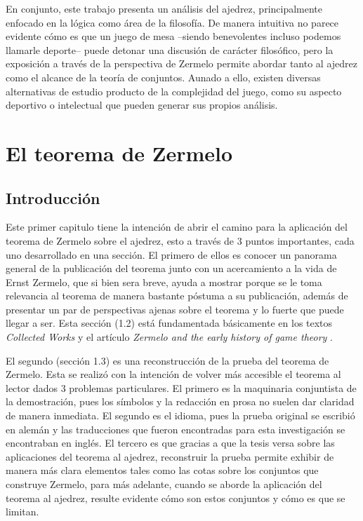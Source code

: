\documentclass[twoside,openright,12pt,a4paper,spanish]{book}
\begin{document}
En conjunto, este trabajo presenta un análisis del ajedrez, principalmente enfocado en la lógica como área de la filosofía. De manera intuitiva no parece evidente cómo es que un juego de mesa --siendo benevolentes incluso podemos llamarle deporte-- puede detonar una discusión de carácter filosófico, pero la exposición a través de la perspectiva de Zermelo permite abordar tanto al ajedrez como el alcance de la teoría de conjuntos. Aunado a ello, existen diversas alternativas de estudio producto de la complejidad del juego, como su aspecto deportivo o intelectual que pueden generar sus propios análisis.





\chapter{El teorema de Zermelo}
\setcounter{page}{1}

\section{Introducción}

\noindent Este primer capitulo tiene la intención de abrir el camino para la aplicación del teorema de Zermelo sobre el ajedrez, esto a través de 3 puntos importantes, cada uno desarrollado en una sección.
El primero de ellos es conocer un panorama general de la publicación del teorema junto con un acercamiento a la vida de Ernst Zermelo, que si bien sera breve, ayuda a mostrar porque se le toma relevancia al teorema de manera bastante póstuma a su publicación, además de presentar un par de perspectivas ajenas sobre el teorema y lo fuerte que puede llegar a ser. Esta sección (1.2) está fundamentada básicamente en los textos \emph{Collected Works} \cite{zermelo2010ernst} y el artículo \emph{Zermelo and the early history of game theory} \cite{schwalbe2001zermelo}.

El segundo (sección 1.3) es una reconstrucción de la prueba del teorema de Zermelo. Esta se realizó con la intención de volver más accesible el teorema al lector dados 3 problemas particulares. El primero es la maquinaria conjuntista de la demostración, pues los símbolos y la redacción en prosa no suelen dar claridad de manera inmediata. El segundo es el idioma, pues la prueba original se escribió en alemán y las traducciones que fueron encontradas para esta investigación se encontraban en inglés. El tercero es que gracias a que la tesis versa sobre las aplicaciones del teorema al ajedrez, reconstruir la prueba permite exhibir de manera más clara elementos tales como las cotas sobre los conjuntos que construye Zermelo, para más adelante, cuando se aborde la aplicación del teorema al ajedrez, resulte evidente cómo son estos conjuntos y cómo es que se limitan.
\end{document}

